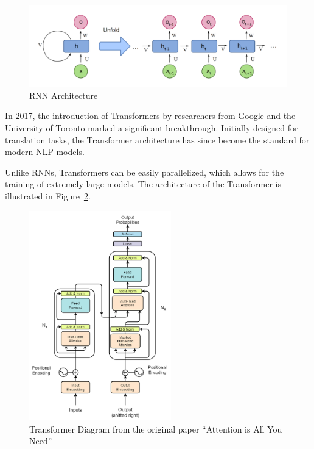 \begin{figure}[htbp]
  \centering
  \includegraphics[width=1\textwidth]{images/RNN.png}
  \caption{RNN Architecture} %
  \label{fig:rnn_architecture}
\end{figure}

In 2017, the introduction of Transformers by researchers from Google and the University of Toronto marked a significant breakthrough. Initially designed for translation tasks, the Transformer architecture has since become the standard for modern NLP models.

Unlike RNNs, Transformers can be easily parallelized, which allows for the training of extremely large models. The architecture of the Transformer is illustrated in Figure~\ref{fig:transformer_architecture}.

\begin{figure}[H]
  \centering
  \includegraphics[width=0.55\textwidth]{images/Transformer Architecture.png}
  \caption{Transformer Diagram from the original paper ``Attention is All You Need''} %
  \label{fig:transformer_architecture}
\end{figure}

